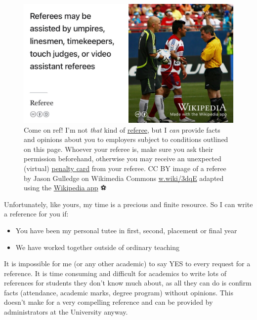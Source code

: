 \documentclass[
  12pt,
]{book}
\providecommand{\tightlist}{%
  \setlength{\itemsep}{0pt}\setlength{\parskip}{0pt}}
\begin{document}
\begin{figure}

{\centering \includegraphics[width=0.99\linewidth]{images/referee} 

}

\caption{Come on ref! I'm not \emph{that} kind of \href{https://en.wikipedia.org/wiki/Referee}{referee}, but I \emph{can} provide facts and opinions about you to employers subject to conditions outlined on this page. Whoever your referee is, make sure you ask their permission beforehand, otherwise you may receive an unexpected (virtual) \href{https://en.wikipedia.org/wiki/Penalty_card}{penalty card} from your referee. CC BY image of a referee by Jason Gulledge on Wikimedia Commons \href{https://w.wiki/3dqE}{w.wiki/3dqE} adapted using the \href{https://apps.apple.com/us/app/wikipedia/id324715238}{Wikipedia app} ⚽️}\label{fig:referee-fig}
\end{figure}



Unfortunately, like yours, my time is a precious and finite resource. So I can write a reference for you if:

\begin{itemize}
\tightlist
\item
  You have been my personal tutee in first, second, placement or final year
\item
  We have worked together outside of ordinary teaching
\end{itemize}

It is impossible for me (or any other academic) to say YES to every request for a reference. It is time consuming and difficult for academics to write lots of references for students they don't know much about, as all they can do is confirm facts (attendance, academic marks, degree program) without opinions. This doesn't make for a very compelling reference and can be provided by administrators at the University anyway.
\end{document}
